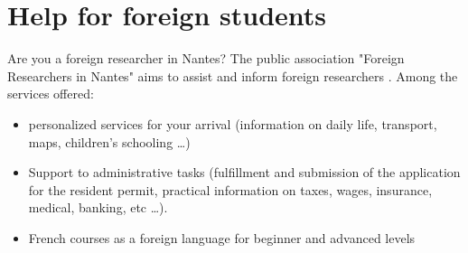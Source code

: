 
\section{Help for foreign students}
Are you a foreign researcher in Nantes?
The public association "Foreign Researchers in Nantes" aims to assist and inform foreign researchers .
Among the services offered:
\begin{itemize}
   \item personalized services for your arrival (information on daily life, transport, maps, children's schooling \dots)
   \item Support to administrative tasks (fulfillment and submission of the application for the resident permit, practical information on taxes, wages, insurance, medical, banking, etc \dots).
   \item French courses as a foreign language for beginner and advanced levels
\end{itemize}


